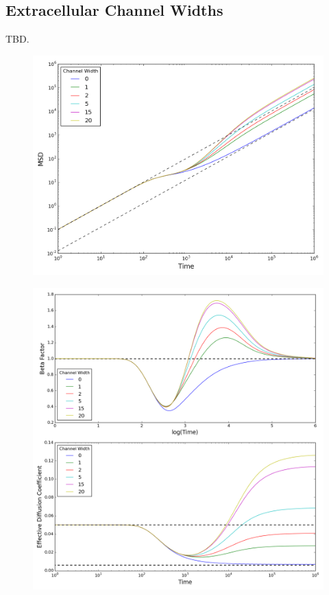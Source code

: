 \clearpage
\subsection{Extracellular Channel Widths}
\label{sec:2D-channel-width}
	TBD.
	\begin{figure}[h]
		\centering
		\includegraphics[width=1.0\linewidth]{../images/2D/ye_msd_2D}
		\caption{}
		\label{fig:ye_msd_2D}
	\end{figure}
	
	\begin{figure}[h]
		\centering
		\includegraphics[width=1.0\linewidth]{../images/2D/ye_beta_deff_2D}
		\caption{}
		\label{fig:ye_beta_deff_2D}
	\end{figure}

	